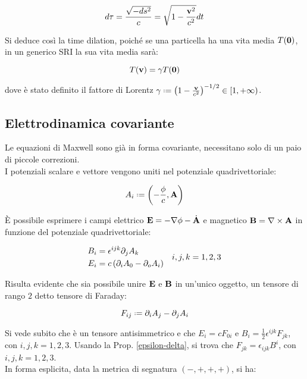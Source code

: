\begin{equation}
	d \tau = \frac{\sqrt{-ds^2}}{c} = \sqrt{1 - \frac{\mathbf{v}^2}{c^2}} dt
	\label{eq:2.19}
\end{equation}

Si deduce così la time dilation, poiché se una particella ha una vita media $ T(\mathbf{0}) $, in un generico SRI la sua vita media sarà:

\begin{equation}
	T(\mathbf{v}) = \gamma T(\mathbf{0})
	\label{eq:2.20}
\end{equation}

dove è stato definito il fattore di Lorentz $ \gamma \defeq \left(1 - \frac{\ve{v}}{c^2}\right)^{-1/2} \in [1, +\infty) $.

\subsection{Elettrodinamica covariante}

Le equazioni di Maxwell sono già in forma covariante, necessitano solo di un paio di piccole correzioni.\\
I potenziali scalare e vettore vengono uniti nel potenziale quadrivettoriale:

\begin{equation}
	A_i \defeq \left(-\frac{\phi}{c}, \ve{A}\right)
	\label{eq:2.21}
\end{equation}

È possibile esprimere i campi elettrico $ \mathbf{E} = - \nabla \phi - \dot{\mathbf{A}} $ e magnetico $ \mathbf{B} = \nabla\times\mathbf{A} $ in funzione del potenziale quadrivettoriale:

\begin{equation}
	\begin{split}
		B_i &= \epsilon^{ijk} \partial_j A_k\\
		E_i &= c \left(\partial_i A_0 - \partial_o A_i\right)
	\end{split}
	\quad i,j,k = 1,2,3
	\label{eq:2.22}
\end{equation}

Risulta evidente che sia possibile unire $ \mathbf{E} $ e $ \mathbf{B} $ in un'unico oggetto, un tensore di rango $ 2 $ detto tensore di Faraday:

\begin{equation}
	F_{ij} \defeq \pa_i A_j - \pa_j A_i
	\label{eq:2.23}
\end{equation}

Si vede subito che è un tensore antisimmetrico e che $ E_i = c F_{0i} $ e $ B_i = \frac{1}{2} \epsilon^{ijk} F_{jk} $, con $ i,j,k = 1,2,3 $. Usando la Prop. \ref{epsilon-delta}, si trova che $ F_{jk} = \epsilon_{ijk} B^i $, con $ i,j,k = 1,2,3 $.\\
In forma esplicita, data la metrica di segnatura $ (-,+,+,+) $, si ha:

